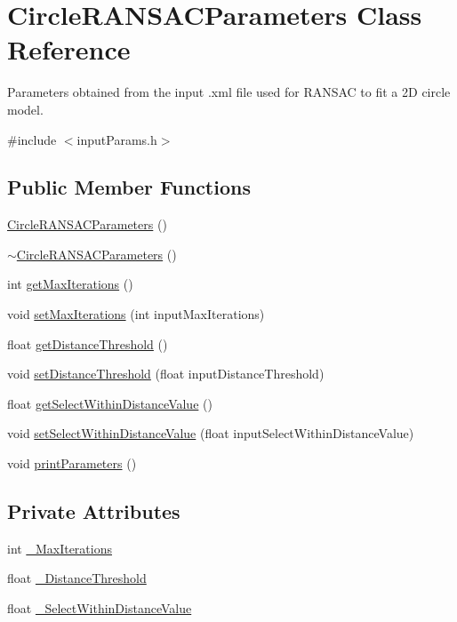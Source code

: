 \hypertarget{classCircleRANSACParameters}{\section{Circle\-R\-A\-N\-S\-A\-C\-Parameters Class Reference}
\label{classCircleRANSACParameters}
}


Parameters obtained from the input .xml file used for R\-A\-N\-S\-A\-C to fit a 2\-D circle model.  




{\ttfamily \#include $<$input\-Params.\-h$>$}

\subsection*{Public Member Functions}
\begin{DoxyCompactItemize}
\item 
\hyperlink{classCircleRANSACParameters_ab7c999366414eec5819cdd11a291b291}{Circle\-R\-A\-N\-S\-A\-C\-Parameters} ()
\item 
\hyperlink{classCircleRANSACParameters_a15eed89c8fcf974340393a3a9765cc55}{$\sim$\-Circle\-R\-A\-N\-S\-A\-C\-Parameters} ()
\item 
int \hyperlink{classCircleRANSACParameters_acdba773dd709e12ab2d7d0d4597932c5}{get\-Max\-Iterations} ()
\item 
void \hyperlink{classCircleRANSACParameters_a880cf54ef4625e5873fd0b13e2031cf4}{set\-Max\-Iterations} (int input\-Max\-Iterations)
\item 
float \hyperlink{classCircleRANSACParameters_a5eb539b967eb5efd77f209560a4a2a1d}{get\-Distance\-Threshold} ()
\item 
void \hyperlink{classCircleRANSACParameters_ad700d0826e837161eeadf79543b31082}{set\-Distance\-Threshold} (float input\-Distance\-Threshold)
\item 
float \hyperlink{classCircleRANSACParameters_a3b7da386121b9b4b8ca209388fa6b8cf}{get\-Select\-Within\-Distance\-Value} ()
\item 
void \hyperlink{classCircleRANSACParameters_ac0f13163b3bfa93ef90cf3dfbe2df3aa}{set\-Select\-Within\-Distance\-Value} (float input\-Select\-Within\-Distance\-Value)
\item 
void \hyperlink{classCircleRANSACParameters_a38f926e6d09bfdb1b64c347f7bd7a0b5}{print\-Parameters} ()
\end{DoxyCompactItemize}
\subsection*{Private Attributes}
\begin{DoxyCompactItemize}
\item 
int \hyperlink{classCircleRANSACParameters_a32cb281a19a165fc4042f31e8ae5bb40}{\-\_\-\-Max\-Iterations}
\item 
float \hyperlink{classCircleRANSACParameters_a1002458dc1b6751e3188b1e1de076ac0}{\-\_\-\-Distance\-Threshold}
\item 
float \hyperlink{classCircleRANSACParameters_a5d030b3d671442a82f571daf2d5f3d4a}{\-\_\-\-Select\-Within\-Distance\-Value}
\end{DoxyCompactItemize}


